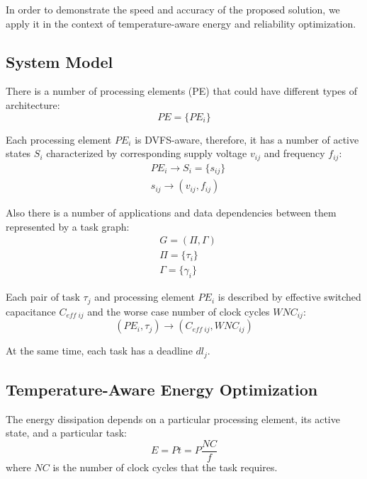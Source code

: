 In order to demonstrate the speed and accuracy of the proposed solution, we apply it in the context of temperature-aware energy and reliability optimization.

\subsection{System Model}
There is a number of processing elements (PE) that could have different types of architecture:
\[
  PE = \{ PE_i \}
\]


Each processing element $PE_i$ is DVFS-aware, therefore, it has a number of active states $S_i$ characterized by corresponding supply voltage $v_{ij}$ and frequency $f_{ij}$:
\begin{align*}
  & PE_i \rightarrow S_i = \{ s_{ij} \} \\
  & s_{ij} \rightarrow (v_{ij}, f_{ij})
\end{align*}

Also there is a number of applications and data dependencies between them represented by a task graph:
\begin{align*}
  & G = (\Pi, \Gamma) \\
  & \Pi = \{\tau_i\} \\
  & \Gamma = \{\gamma_i\}
\end{align*}

Each pair of task $\tau_j$ and processing element $PE_i$ is described by effective switched capacitance $C_{eff \; ij}$ and the worse case number of clock cycles $WNC_{ij}$:
\[
  (PE_i, \tau_j) \rightarrow (C_{eff \; ij}, WNC_{ij})
\]

At the same time, each task has a deadline $dl_j$.

\subsection{Temperature-Aware Energy Optimization}
The energy dissipation depends on a particular processing element, its active state, and a particular task:
\[
  E = P t = P \frac{NC}{f}
\]
where $NC$ is the number of clock cycles that the task requires.

